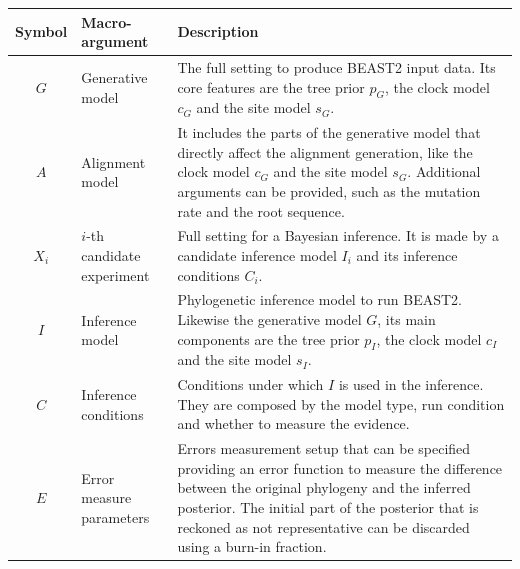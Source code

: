 \begin{table}
  \begin{tabular}{|@{}c|p{4cm}|p{12.2cm}|}
    \hline
    \centering
    \textbf{Symbol} &
    \textbf{Macro-argument} &
    \textbf{Description} \\
    \hline
    $\mathit{G}$ &
    Generative model &
    The full setting to produce BEAST2 input data. 
    Its core features are the tree prior $\mathit{p_{G}}$, the clock 
    model $\mathit{c_{G}}$ and the site model $\mathit{s_{G}}$. \\
    $\mathit{A}$ &
    Alignment model &
    It includes the parts of the generative model that directly affect the 
    alignment generation, like the clock model $\mathit{c_{G}}$ and 
    the site model $\mathit{s_{G}}$. Additional arguments can be provided, 
    such as the mutation rate and the root sequence. \\
    $\mathit{X_{i}}$ &
    $i$-th candidate experiment &
    Full setting for a Bayesian inference. It is made by a 
    candidate inference model $\mathit{I_{i}}$ and its 
    inference conditions $\mathit{C_{i}}$. \\
    $\mathit{I}$ &
    Inference model &
    Phylogenetic inference model to run BEAST2. Likewise the generative model $G$, 
    its main components are the tree prior $\mathit{p_{I}}$, 
    the clock model $\mathit{c_{I}}$ and the site model $\mathit{s_{I}}$. \\
    $\mathit{C}$ & Inference conditions & Conditions under which $\mathit{I}$ 
    is used in the inference. 
    They are composed by the model type, run condition and 
    whether to measure the evidence. \\
    $\mathit{E}$ & Error measure parameters & 
    Errors measurement setup that can be specified providing an 
    error function to measure the difference between the original phylogeny 
    and the inferred posterior. The initial part of the posterior that is 
    reckoned as not representative can be discarded using a burn-in fraction. \\

\end{tabular}
\end{table}
